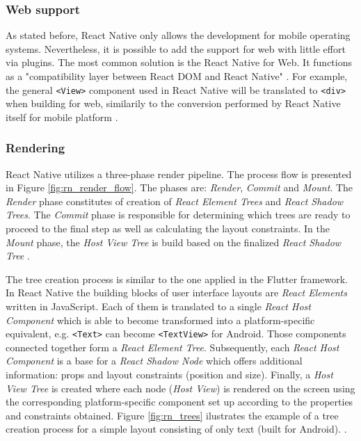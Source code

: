 \subsubsection*{Web support}

As stated before, React Native only allows the development for mobile operating systems. Nevertheless, it is possible to add the support for web with little effort via plugins. The most common solution is the React Native for Web. It functions as a "compatibility layer between React DOM and React Native" \cite{react_native_web_docs}. For example, the general \texttt{<View>} component used in React Native will be translated to \texttt{<div>} when building for web, similarily to the conversion performed by React Native itself for mobile platform \cite{harsh_complete_guide_to_rn_web}. 

\subsubsection*{Rendering}

React Native utilizes a three-phase render pipeline. The process flow is presented in Figure \ref{fig:rn_render_flow}. The phases are: \emph{Render}, \emph{Commit} and \emph{Mount}. The \emph{Render} phase constitutes of creation of \emph{React Element Trees} and \emph{React Shadow Trees}. The \emph{Commit} phase is responsible for determining which trees are ready to proceed to the final step as well as calculating the layout constraints. In the \emph{Mount} phase, the \emph{Host View Tree} is build based on the finalized \emph{React Shadow Tree} \cite{react_native_docs_render}.

The tree creation process is similar to the one applied in the Flutter framework. In React Native the building blocks of user interface layouts are \emph{React Elements} written in JavaScript. Each of them is translated to a single \emph{React Host Component} which is able to become transformed into a platform-specific equivalent, e.g. \texttt{<Text>} can become \texttt{<TextView>} for Android. Those components connected together form a \emph{React Element Tree}. Subsequently, each \emph{React Host Component} is a base for a \emph{React Shadow Node} which offers additional information: props and layout constraints (position and size). Finally, a \emph{Host View Tree} is created where each node (\emph{Host View}) is rendered on the screen using the corresponding platform-specific component set up according to the properties and constraints obtained. Figure \ref{fig:rn_trees} ilustrates the  example of a tree creation process for a simple layout consisting of only text (built for Android). \cite{react_native_docs_render}.

